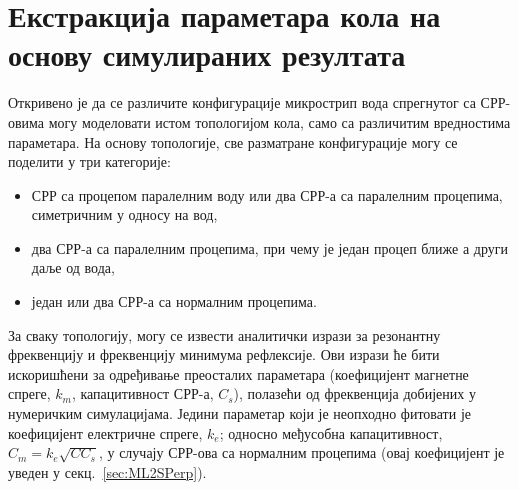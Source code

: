 \section{Екстракција параметара кола на основу симулираних резултата}

Откривено је да се различите конфигурације микрострип вода спрегнутог са СРР-овима могу моделовати истом топологијом кола, само са различитим вредностима параметара. На основу топологије, све разматране конфигурације могу се поделити у три категорије:
\begin{itemize}
\item СРР са процепом паралелним воду или два СРР-а са паралелним процепима, симетричним у односу на вод,
\item два СРР-а са паралелним процепима, при чему је један процеп ближе а други даље од вода,
\item један или два СРР-а са нормалним процепима.
\end{itemize}
За сваку топологију, могу се извести аналитички изрази за резонантну фреквенцију и фреквенцију минимума рефлексије. Ови изрази ће бити искоришћени за одређивање преосталих параметара (коефицијент магнетне спреге, $k_m$, капацитивност СРР-а, $C_s$), полазећи од фреквенција добијених у нумеричким симулацијама. Једини параметар који је неопходно фитовати је коефицијент електричне спреге, $k_e$; односно међусобна капацитивност, $C_m=k_e \sqrt{CC_s }$, у случају СРР-ова са нормалним процепима (овај коефицијент је уведен у секц.~\ref{sec:ML2SPerp}). 


